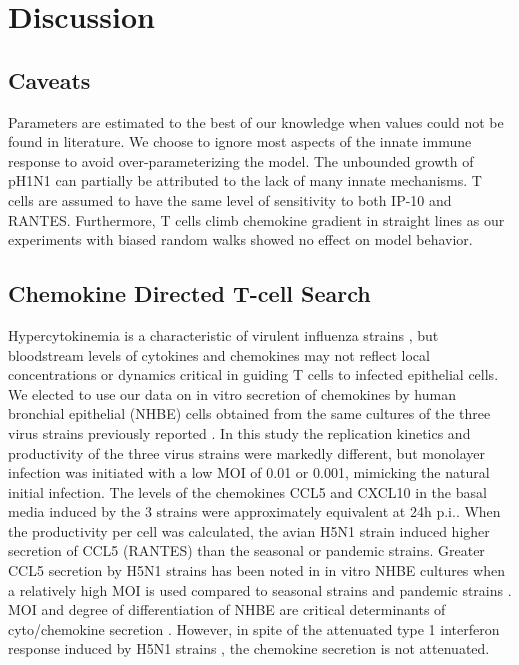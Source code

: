 \documentclass[10pt]{article}
\begin{document}
\section*{Discussion}

\subsection*{Caveats}

Parameters are estimated to the best of our knowledge when values could not be found in literature.  We choose to ignore most aspects of the innate immune response to avoid over-parameterizing the model.  The unbounded growth of pH1N1 can partially be attributed to the lack of many innate mechanisms.  T cells are assumed to have the same level of sensitivity to both IP-10 and RANTES.  Furthermore, T cells climb chemokine gradient in straight lines as our experiments with biased random walks showed no effect on model behavior.

\subsection*{Chemokine Directed T-cell Search}

Hypercytokinemia is a characteristic of virulent influenza strains \cite{DeJong2006}, but bloodstream levels of cytokines and chemokines may not reflect local concentrations or dynamics critical in guiding T cells to infected epithelial cells.  We elected to use our data on in vitro secretion of chemokines by human bronchial epithelial (NHBE) cells obtained from the same cultures of the three virus strains previously reported \cite{Mitchell2011}.  In this study the replication kinetics and productivity of the three virus strains were markedly different, but monolayer infection was initiated with a low MOI of 0.01 or 0.001, mimicking the natural initial infection.  The levels of the chemokines CCL5 and CXCL10 in the basal media induced by the 3 strains were approximately equivalent at 24h p.i..  When the productivity per cell was calculated, the avian H5N1 strain induced higher secretion of CCL5 (RANTES) than the seasonal or pandemic strains.  Greater CCL5 secretion by H5N1 strains has been noted in in vitro NHBE cultures when a relatively high MOI is used compared to seasonal strains \cite{Chan2005, Chan2010, Zeng2011} and pandemic strains \cite{Zeng2011}.  MOI and degree of differentiation of NHBE are critical determinants of cyto/chemokine secretion \cite{Chan2010}.  However, in spite of the attenuated type 1 interferon response induced by H5N1 strains \cite{Zeng2007}, the chemokine secretion is not attenuated.
\end{document}

